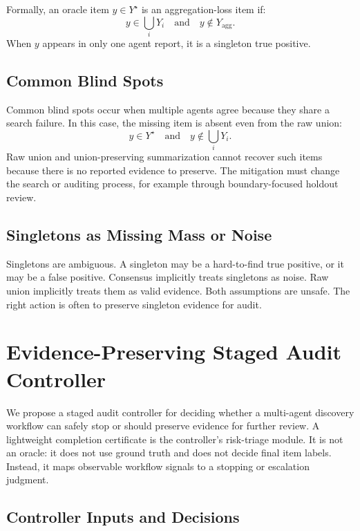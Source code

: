 \documentclass[letterpaper]{article}
\begin{document}
Formally, an oracle item $y \in Y^\star$ is an aggregation-loss item if:
\begin{equation}
y \in \bigcup_i Y_i \quad \text{and} \quad y \notin Y_{\text{agg}}.
\end{equation}
When $y$ appears in only one agent report, it is a singleton true positive.

\subsection{Common Blind Spots}

Common blind spots occur when multiple agents agree because they share a search
failure. In this case, the missing item is absent even from the raw union:
\begin{equation}
y \in Y^\star \quad \text{and} \quad y \notin \bigcup_i Y_i.
\end{equation}
Raw union and union-preserving summarization cannot recover such items because
there is no reported evidence to preserve. The mitigation must change the search
or auditing process, for example through boundary-focused holdout review.

\subsection{Singletons as Missing Mass or Noise}

Singletons are ambiguous. A singleton may be a hard-to-find true positive, or it
may be a false positive. Consensus implicitly treats singletons as noise. Raw
union implicitly treats them as valid evidence. Both assumptions are unsafe. The
right action is often to preserve singleton evidence for audit.

\section{Evidence-Preserving Staged Audit Controller}

We propose a staged audit controller for deciding whether a multi-agent
discovery workflow can safely stop or should preserve evidence for further
review. A lightweight completion certificate is the controller's risk-triage
module. It is not an oracle: it does not use ground truth and does not decide
final item labels. Instead, it maps observable workflow signals to a stopping
or escalation judgment.

\subsection{Controller Inputs and Decisions}
\end{document}
